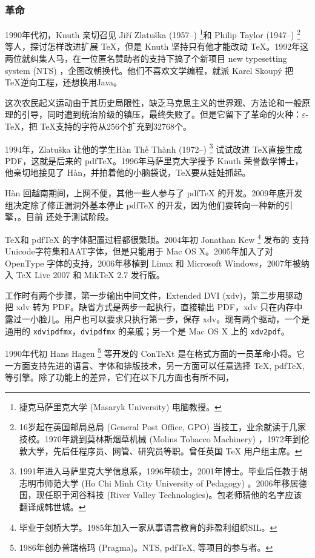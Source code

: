 \subsubsection{革命}

1990年代初，Knuth 亲切召见 Jiří Zlatuška (1957--)\indexZlatuska{} \footnote{捷克马萨里克大学 (Masaryk University) 电脑教授。}和 Philip Taylor (1947--)\indexTaylor{} \footnote{16岁起在英国邮局总局 (General Post Office, GPO) 当技工，业余就读于几家技校。1970年跳到莫林斯烟草机械 (Molins Tobacco Machinery) ，1972年到伦敦大学，先后任程序员、网管、研究员等职。曾任英国 TeX 用户组主席。} 等人，探讨怎样改进扩展 \TeX ，但是 Knuth 坚持只有他才能改动 \TeX。1992年这两位就纠集人马，在一位匿名赞助者的支持下搞了个新项目 new typesetting system (NTS) ，企图改朝换代。他们不喜欢文学编程，就派 Karel Skoupý 把 \TeX 逆向工程，还想换用Java。

这次农民起义运动由于其历史局限性，缺乏马克思主义的世界观、方法论和一般原理的引导，同时遭到统治阶级的镇压，最终失败了。但是它留下了革命的火种：$\varepsilon$-\TeX ，把 \TeX 支持的字符从256个扩充到32768个。

1994年，Zlatuška 让他的学生{\lmr Hàn Thế Thành} (1972--)\indexHan{} \footnote{1991年进入马萨里克大学信息系，1996年硕士，2001年博士。毕业后任教于胡志明市师范大学 (Ho Chi Minh City University of Pedagogy) 。2006年移居德国，现任职于河谷科技 (River Valley Technologies)。包老师猜他的名字应该翻译成韩世城。} 试试改进 \TeX 直接生成 PDF，这就是后来的 pdfTeX。1996年马萨里克大学授予 Knuth 荣誉数学博士，他亲切地接见了 Hàn，并拍着他的小脑袋说，\TeX 要从娃娃抓起。

Hàn 回越南期间，上网不便，其他一些人参与了 pdfTeX 的开发。2009年底开发组决定除了修正漏洞外基本停止 pdfTeX 的开发，因为他们要转向一种新的引擎，\LuaTeX。目前 \LuaTeX 还处于测试阶段。

\TeX 和 pdfTeX 的字体配置过程都很繁琐。2004年初 Jonathan Kew\indexKew{} \footnote{毕业于剑桥大学。1985年加入一家从事语言教育的非盈利组织SIL\indexSIL。} 发布的 \XeTeX 支持Unicode字符集和AAT字体，但是只能用于 Mac OS X。2005年加入了对 OpenType 字体的支持，2006年移植到 Linux 和 Microsoft Windows，2007年被纳入 TeX Live 2007 和 MikTeX 2.7 发行版。

\XeTeX 工作时有两个步骤，第一步输出中间文件，Extended DVI (xdv)，第二步用驱动把 xdv 转为 PDF。缺省方式是两步一起执行，直接输出 PDF，xdv 只在内存中露过一小脸儿。用户也可以要求只执行第一步，保存 xdv。\XeTeX 现有两个驱动，一个是通用的 \texttt{xdvipdfmx}，\texttt{dvipdfmx} 的亲戚；另一个是 Mac OS X 上的 \texttt{xdv2pdf}。

1990年代初 Hans Hagen\indexHagen{} \footnote{1986年创办普瑞格玛 (Pragma)\indexPragma。NTS, pdfTeX, \LuaTeX 等项目的参与者。} 等开发的 Con\TeX t 是在格式方面的一员革命小将。它一方面支持先进的语言、字体和排版技术，另一方面可以任意选择 \TeX, pdfTeX, \LuaTeX 等引擎。除了功能上的差异，它们在以下几方面也有所不同，


